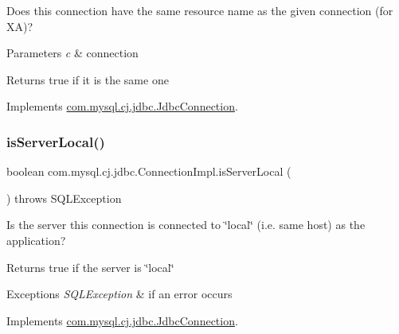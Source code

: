 Does this connection have the same resource name as the given connection (for XA)?


\begin{DoxyParams}{Parameters}
{\em c} & connection \\
\hline
\end{DoxyParams}
\begin{DoxyReturn}{Returns}
true if it is the same one 
\end{DoxyReturn}


Implements \mbox{\hyperlink{interfacecom_1_1mysql_1_1cj_1_1jdbc_1_1_jdbc_connection_a90906591d933e0d9f10dbb9db6b5a83a}{com.\+mysql.\+cj.\+jdbc.\+Jdbc\+Connection}}.

\mbox{\label{classcom_1_1mysql_1_1cj_1_1jdbc_1_1_connection_impl_a9f0926c4f30516633878b4315f7c073c}} 
\subsubsection{\texorpdfstring{is\+Server\+Local()}{isServerLocal()}}
{\footnotesize\ttfamily boolean com.\+mysql.\+cj.\+jdbc.\+Connection\+Impl.\+is\+Server\+Local (\begin{DoxyParamCaption}{ }\end{DoxyParamCaption}) throws S\+Q\+L\+Exception}

Is the server this connection is connected to \char`\"{}local\char`\"{} (i.\+e. same host) as the application?

\begin{DoxyReturn}{Returns}
true if the server is \char`\"{}local\char`\"{} 
\end{DoxyReturn}

\begin{DoxyExceptions}{Exceptions}
{\em S\+Q\+L\+Exception} & if an error occurs \\
\hline
\end{DoxyExceptions}


Implements \mbox{\hyperlink{interfacecom_1_1mysql_1_1cj_1_1jdbc_1_1_jdbc_connection_a4418f89cdbd768f892b6ef7823107921}{com.\+mysql.\+cj.\+jdbc.\+Jdbc\+Connection}}.

\mbox{\label{classcom_1_1mysql_1_1cj_1_1jdbc_1_1_connection_impl_a51c33076411dab0f4d9a6b73b2081637}} 
